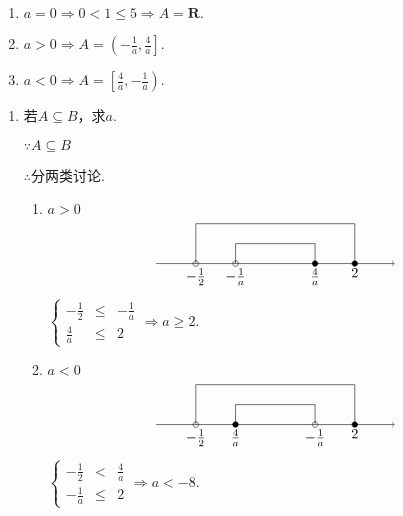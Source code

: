 \documentclass[8pt]{article}
\begin{document}
				\begin{enumerate}[label=$\arabic*^{\circ}$]
					\item $a=0\Rightarrow 0<1\leq 5 \Rightarrow A=\mathbf{R}.$
					\item $a>0\Rightarrow A=\left(-\frac{1}{a}, \frac{4}{a}\right].$
					\item $a<0\Rightarrow A=\left[\frac{4}{a}, -\frac{1}{a}\right).$
				\end{enumerate}
				\begin{enumerate}[label=$(\arabic*)$]

					\item 若$A\subseteq B$，求$a$.

						$\because A\subseteq B$

						$\therefore$分两类讨论.

						\begin{enumerate}[label=$\arabic*^{\circ}$]
							\item $a>0$
								$$
									\begin{tikzpicture} [scale=0.5]
										\draw [black] [->] (-6, 0)--(6, 0);
										\draw [black] (-4, 0) circle (4pt) node[anchor=north] {$-\frac{1}{2}$};
										\filldraw [black] (4, 0) circle (4pt) node[anchor=north] {$2$};
										\draw [black] (-2, 0) circle (4pt) node[anchor=north] {$-\frac{1}{a}$};
										\filldraw [black] (2, 0) circle (4pt) node[anchor=north] {$\frac{4}{a}$};
										\draw [black] (-4, 0)--(-4, 2)--(4, 2)--(4, 0);
										\draw [black] (-2, 0)--(-2, 1)--(2, 1)--(2, 0);
									\end{tikzpicture}
								$$
								$\displaystyle\left\{\begin{array}{rcl}-\frac{1}{2}&\leq&-\frac{1}{a}\\\frac{4}{a}&\leq&2\end{array}\right.\Rightarrow a\geq 2.$

							\item $a<0$
								$$
									\begin{tikzpicture} [scale=0.5]
										\draw [black] [->] (-6, 0)--(6, 0);
										\draw [black] (-4, 0) circle (4pt) node[anchor=north] {$-\frac{1}{2}$};
										\filldraw [black] (4, 0) circle (4pt) node[anchor=north] {$2$};
										\filldraw [black] (-2, 0) circle (4pt) node[anchor=north] {$\frac{4}{a}$};
										\draw [black] (2, 0) circle (4pt) node[anchor=north] {$-\frac{1}{a}$};
										\draw [black] (-4, 0)--(-4, 2)--(4, 2)--(4, 0);
										\draw [black] (-2, 0)--(-2, 1)--(2, 1)--(2, 0);
									\end{tikzpicture}
								$$
								$\displaystyle\left\{\begin{array}{rcl}-\frac{1}{2}&<&\frac{4}{a}\\-\frac{1}{a}&\leq&2\end{array}\right.\Rightarrow a<-8.$
						\end{enumerate}


\end{enumerate}
\end{document}
